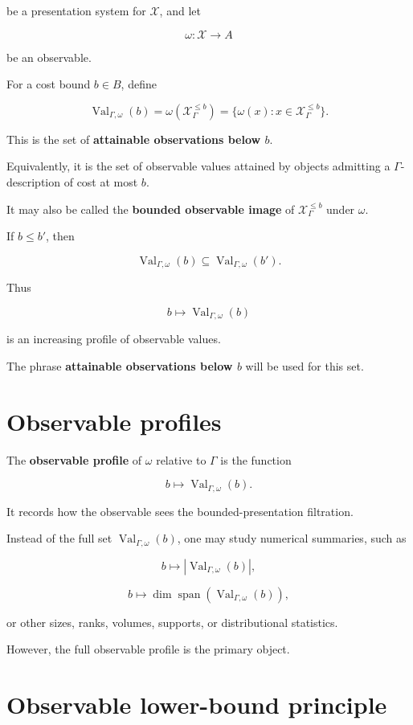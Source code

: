 \documentclass[11pt]{article}
\begin{document}
be a presentation system for \(\mathcal X\), and let

\[
\omega:\mathcal X\to A
\]

be an observable.

For a cost bound \(b\in B\), define

\[
\operatorname{Val}_{\Gamma,\omega}(b)=\omega(\mathcal X_\Gamma^{\leq b})=\{\omega(x):x\in\mathcal X_\Gamma^{\leq b}\}.
\]

This is the set of \textbf{attainable observations below \(b\)}.

Equivalently, it is the set of observable values attained by objects admitting a \(\Gamma\)-description of cost at most \(b\).

It may also be called the \textbf{bounded observable image} of \(\mathcal X_\Gamma^{\leq b}\) under \(\omega\).

If \(b\leq b'\), then

\[
\operatorname{Val}_{\Gamma,\omega}(b)
\subseteq
\operatorname{Val}_{\Gamma,\omega}(b').
\]

Thus

\[
b\mapsto \operatorname{Val}_{\Gamma,\omega}(b)
\]

is an increasing profile of observable values.

The phrase \textbf{attainable observations below \(b\)} will be used for this set.


\section{Observable profiles}

The \textbf{observable profile} of \(\omega\) relative to \(\Gamma\) is the function

\[
b\longmapsto \operatorname{Val}_{\Gamma,\omega}(b).
\]

It records how the observable sees the bounded-presentation filtration.

Instead of the full set \(\operatorname{Val}_{\Gamma,\omega}(b)\), one may study numerical summaries, such as

\[
b\mapsto |\operatorname{Val}_{\Gamma,\omega}(b)|,
\]

\[
b\mapsto \dim \operatorname{span}(\operatorname{Val}_{\Gamma,\omega}(b)),
\]

or other sizes, ranks, volumes, supports, or distributional statistics.

However, the full observable profile is the primary object.


\section{Observable lower-bound principle}
\end{document}
